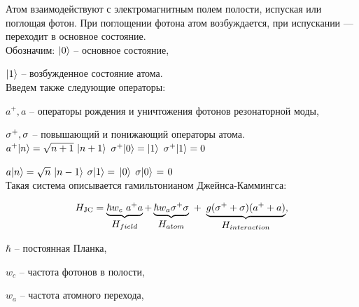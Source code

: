 \noindent Атом взаимодействуют с электромагнитным полем полости, испуская или поглощая фотон. При поглощении фотона атом возбуждается, при испускании --- переходит в основное состояние. 
\\[12pt]
Обозначим:
$|0\rangle$ -- основное состояние,

\hspace{45pt}$|1\rangle$ -- возбужденное состояние атома.
\\[12pt]
Введем также следующие операторы:

\vspace{6pt}
\hspace{5pt}$a^{+}, a$ -- операторы рождения и уничтожения фотонов резонаторной моды,

\hspace{5pt}$\sigma^{+}, \sigma$ -- повышающий и понижающий операторы атома.
\\[1pt]

\hspace{6pt}$a^{+}|n\rangle = \sqrt{n+1}\ |n+1\rangle$
\hspace{33pt}$\sigma^{+}|0\rangle = |1\rangle$
\hspace{23pt}$\sigma^{+}|1\rangle = 0$

\hspace{15pt}$a|n\rangle = \sqrt{n}\ |n-1\rangle$
\hspace{70pt}$\sigma|1\rangle =\hspace{2pt}|0\rangle$
\hspace{32pt}$\sigma|0\rangle\hspace{1pt} = \hspace{1pt}0$
\\[18pt]
Такая система описывается гамильтонианом Джейнса-Каммингса:
\begin{normalsize}
	\begin{equation}
		H_{\text{JC}} = \underbrace{\hbar w_{c}\ a^{+}a}_{\textstyle H_{field}} + \underbrace{\hbar w_{a}\s^{+}\s}_{\textstyle H_{atom}}~+~\underbrace{g(\s^{+}+\s)(a^{+}+a)}_{\textstyle H_{interaction}},
	\end{equation}
\end{normalsize}

\hspace{25pt}$\hbar $ -- постоянная Планка,

\hspace{22pt}$w_{c}$ -- частота фотонов в полости,

\hspace{22pt}$w_{a}$ -- частота атомного перехода,

